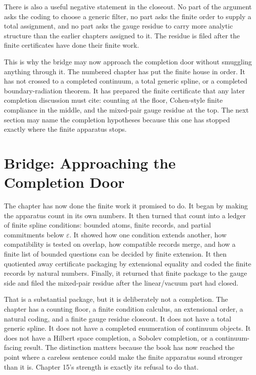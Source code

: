 There is also a useful negative statement in the closeout. No part of the
argument asks the coding to choose a generic filter, no part asks the finite
order to supply a total assignment, and no part asks the gauge residue to carry
more analytic structure than the earlier chapters assigned to it. The residue
is filed after the finite certificates have done their finite work.

This is why the bridge may now approach the completion door without smuggling
anything through it. The numbered chapter has put the finite house in order. It
has not crossed to a completed continuum, a total generic spline, or a completed
boundary-radiation theorem. It has prepared the finite certificate that any
later completion discussion must cite: counting at the floor, Cohen-style
finite compliance in the middle, and the mixed-pair gauge residue at the top.
The next section may name the completion hypotheses because this one has
stopped exactly where the finite apparatus stops.

\section*{Bridge: Approaching the Completion Door}

The chapter has now done the finite work it promised to do. It began by making
the apparatus count in its own numbers. It then turned that count into a ledger
of finite spline conditions: bounded atoms, finite records, and partial
commitments below \(\varepsilon\). It showed how one condition extends another,
how compatibility is tested on overlap, how compatible records merge, and how a
finite list of bounded questions can be decided by finite extension. It then
quotiented away certificate packaging by extensional equality and coded the
finite records by natural numbers. Finally, it returned that finite package to
the gauge side and filed the mixed-pair residue after the linear/vacuum part had
closed.

That is a substantial package, but it is deliberately not a completion. The
chapter has a counting floor, a finite condition calculus, an extensional order,
a natural coding, and a finite gauge residue closeout. It does not have a total
generic spline. It does not have a completed enumeration of continuum objects.
It does not have a Hilbert space completion, a Sobolev completion, or a
continuum-facing result. The distinction matters because the book has now reached the
point where a careless sentence could make the finite apparatus sound stronger
than it is. Chapter 15's strength is exactly its refusal to do that.


